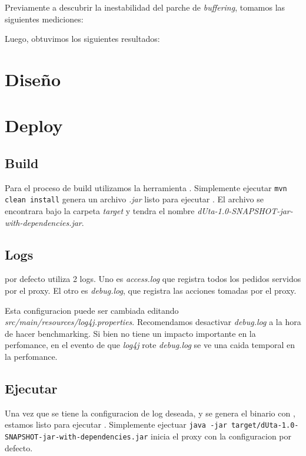 \documentclass[11pt,a4paper,titlepage]{article}
\begin{document}
    Previamente a descubrir la inestabilidad del parche de \textit{buffering}, tomamos las siguientes mediciones:


    Luego, obtuvimos los siguientes resultados:




\section{Diseño}

\section{Deploy}
    \subsection{Build}
    Para el proceso de build utilizamos la herramienta .
    Simplemente ejecutar \texttt{mvn clean install} genera un archivo \textit{.jar} listo para ejecutar \duta.
    El archivo se encontrara bajo la carpeta \textit{target} y tendra el nombre \textit{dUta-1.0-SNAPSHOT-jar-with-dependencies.jar}.

    \subsection{Logs}
    \duta por defecto utiliza 2 logs.
    Uno es \textit{access.log} que registra todos los pedidos servidos por el proxy.
    El otro es \textit{debug.log}, que registra las acciones tomadas por el proxy.

    Esta configuracion puede ser cambiada editando \textit{src/main/resources/log4j.properties}.
    Recomendamos desactivar \textit{debug.log} a la hora de hacer benchmarking.
    Si bien no tiene un impacto importante en la perfomance, en el evento de que \textit{log4j} rote \textit{debug.log} se ve una caida temporal en la perfomance.

    \subsection{Ejecutar \duta}
    Una vez que se tiene la configuracion de log deseada, y se genera el binario con , estamos listo para ejecutar \duta.
    Simplemente ejectuar \texttt{java -jar target/dUta-1.0-SNAPSHOT-jar-with-dependencies.jar} inicia el proxy con la configuracion por defecto.
\end{document}
